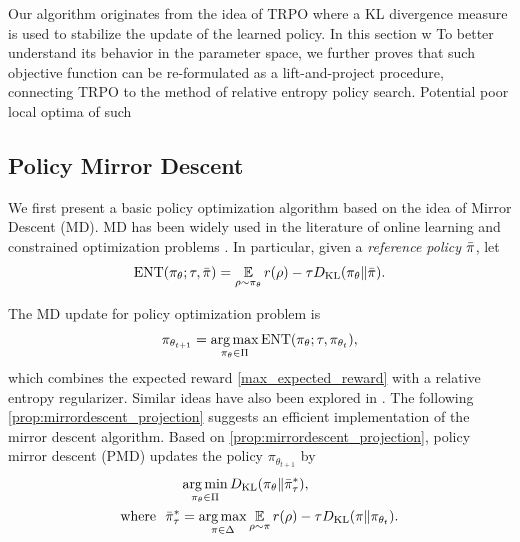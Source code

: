 \documentclass{article} %
\begin{document}
Our algorithm originates from the idea of TRPO where a KL divergence measure is used to stabilize the update of the learned policy. 
In this section w
To better understand its behavior in the parameter space, we further proves that such objective function can be re-formulated as a lift-and-project procedure, connecting TRPO to the method of relative entropy policy search.
Potential poor local optima of such 

\subsection{Policy Mirror Descent}
\label{sec:pmd}
We first present a basic policy optimization algorithm based on the idea of Mirror Descent (MD). MD has been widely used in the literature of online learning and constrained optimization problems \citep{nemirovskii1983problem,beck2003mirror}. In particular, given a \emph{reference policy} $\bar{\pi}$, let 
\begin{equation*}
\text{ENT}(\pi_\theta; \tau, \bar{\pi}) = { \operatorname*{\mathbb{E}}\limits_{\rho \sim \pi_\theta}{  r(\rho)  - \tau D_{\mathrm{KL}}(\pi_\theta \| \bar{\pi}) } }.
\end{equation*}

The MD update for policy optimization problem is 
\begin{equation}
\pi_{\theta_{t+1}} = \operatorname*{arg\,max}\limits_{\pi_\theta \in \Pi}  \text{ENT}(\pi_\theta; \tau, \pi_{\theta_t}), 
\end{equation}
which combines the expected reward \cref{max_expected_reward} with a relative entropy regularizer. Similar ideas have also been explored in \citet{peters2007reinforcement,wierstra2008episodic,peters2010relative,schulman2015trust,montgomery2016guided,nachum2017trust,haarnoja2018soft,abdolmaleki2018maximum}. The following \cref{prop:mirrordescent_projection} suggests an efficient implementation of the mirror descent algorithm.
Based on \cref{prop:mirrordescent_projection}, policy mirror descent (PMD) updates the policy $\pi_{\theta_{t+1}}$ by
\begin{equation}
\label{eq:pmd}
\begin{split}
&\operatorname*{arg\,min}\limits_{\pi_\theta \in \Pi}{D_{\mathrm{KL}}( \pi_\theta \| \bar{\pi}_{\tau}^* )}, \\
\text{where}\ \ \bar{\pi}_{\tau}^* & =  \operatorname*{arg\,max}\limits_{\pi \in \Delta}{ \operatorname*{\mathbb{E}}\limits_{\rho \sim \pi}{  r(\rho)  - \tau D_{\mathrm{KL}}(\pi \| \pi_{\theta_t}) } }.
\end{split}
\end{equation}
\fi
\end{document}

